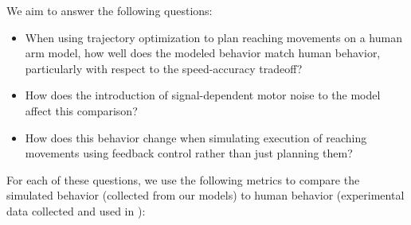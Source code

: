 \documentclass[letterpaper, 10pt, conference]{ieeeconf}
\begin{document}
We aim to answer the following questions: 
\begin{itemize}
    \item When using trajectory optimization to plan reaching movements on a human arm model, how well does the modeled behavior match human behavior, particularly with respect to the speed-accuracy tradeoff?

    \item How does the introduction of signal-dependent motor noise to the model affect this comparison?

    \item How does this behavior change when simulating execution of reaching movements using feedback control rather than just planning them?
\end{itemize}
For each of these questions, we use the following metrics to compare the simulated behavior (collected from our models) to human behavior (experimental data collected and used in \cite{original_paper_high_fidelity}):
\end{document}
